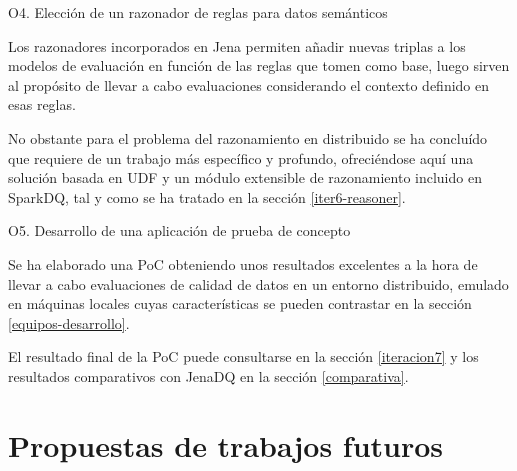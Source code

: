 \begin{definitionlist}
\item [O4. Elección de un razonador de reglas para datos semánticos]

Los razonadores incorporados en Jena permiten añadir nuevas triplas a los
modelos de evaluación en función de las reglas que tomen como base, luego sirven
al propósito de llevar a cabo evaluaciones considerando el contexto definido en
esas reglas. 

No obstante para el problema del razonamiento en distribuido se ha concluído que
requiere de un trabajo más específico y profundo, ofreciéndose aquí una solución
basada en \acf{UDF} y un módulo extensible de razonamiento incluido en SparkDQ,
tal y como se ha tratado en la sección \ref{iter6-reasoner}. 

\item [O5. Desarrollo de una aplicación de prueba de concepto]

Se ha elaborado una \acs{PoC} obteniendo unos resultados excelentes a la hora de
llevar a cabo evaluaciones de calidad de datos en un entorno distribuido,
emulado en máquinas locales cuyas características se pueden contrastar en la
sección \ref{equipos-desarrollo}.

El resultado final de la \acs{PoC} puede consultarse en la sección \ref{iteracion7} y los resultados
comparativos con JenaDQ en la sección \ref{comparativa}. 

\end{definitionlist}

\section{Propuestas de trabajos futuros}


